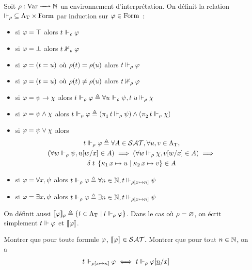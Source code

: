 \begin{definition}
  Soit $\makeFunNamePartial{\env}{\Var}{\bN}$ un environnement
  d'interprétation. On définit la relation
  $\mathord{\Vdash_\rho}\subseteq \Lambda_{\mathrm{T}}\times\operatorname{Form}$ par
  induction sur $\varphi\in\operatorname{Form}$~:
  \begin{itemize}
  \item si $\varphi = \top$ alors $t \Vdash_\rho \varphi$
  \item si $\varphi = \bot$ alors $t\nVdash_\rho\varphi$
  \item si $\varphi = (t = u)$ où $\rho(t) = \rho(u)$ alors
    $t \Vdash_\rho \varphi$
  \item si $\varphi = (t = u)$ où $\rho(t) \neq \rho(u)$ alors
    $t\nVdash_\rho \varphi$
  \item si $\varphi = \psi \to \chi$ alors
    $t\Vdash_\rho \varphi \triangleq \forall u \Vdash_\rho \psi, t\;u \Vdash_\rho
    \chi$
  \item si $\varphi = \psi \land \chi$ alors
    $t\Vdash_\rho \varphi \triangleq
    (\mathop{\pi_{1}^{}} t\Vdash_\rho \psi) \land (\mathop{\pi_{2}^{}} t\Vdash_\rho \chi)$
  \item si $\varphi = \psi \lor \chi$ alors
    \begin{multline*}
      t \Vdash_\rho \varphi \triangleq
      \forall A \in \mathcal{SAT},\forall u,v \in\Lambda_{\mathrm{T}},\\
      (\forall w \Vdash_\rho \psi, u[w/x] \in A) \implies
      (\forall w \Vdash_\rho \chi, v[w/x] \in A)\implies \\
      \delta\;t\;\left\{\mathop{\kappa_{1}} x\mapsto u \;\middle\vert\; \mathop{\kappa_{2}} x\mapsto v\right\} \in A
    \end{multline*}
  \item si $\varphi = \forall x, \psi$ alors
    $t \Vdash_\rho \varphi \triangleq \forall n \in \mathbb N,
    t\Vdash_{\rho[x\mapsto n]} \psi$
  \item si $\varphi = \exists x, \psi$ alors
    $t \Vdash_\rho\varphi\triangleq \exists n \in \mathbb N,
    t\Vdash_{\rho[x\mapsto n]} \psi$
  \end{itemize}
  
  On définit aussi
  $\llbracket\varphi\rrbracket_\rho \triangleq \left\{ t \in \Lambda_{\mathrm{T}} \;\middle\vert\; t \Vdash_\rho \varphi \right\}$.
  Dans le cas où $\rho = \varnothing$, on écrit simplement $t \Vdash \varphi$ et
  $\llbracket\varphi\rrbracket$.
\end{definition}

\begin{exercise}
  Montrer que pour toute formule $\varphi$, $\llbracket\varphi\rrbracket\in\mathcal{SAT}$. Montrer
  que pour tout $n \in \mathbb N$, on a
  \[t\Vdash_{\rho[x\mapsto n]} \varphi \iff t \Vdash_\rho \varphi[\underline{n}/x]\]
\end{exercise}

